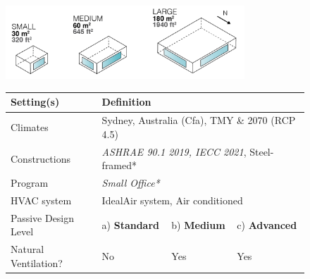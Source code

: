 
\begin{figure}[!h]
    \centering
    \includegraphics[width=0.8\textwidth]{manuscript/src/figures/scenario-size.png}
    \vspace{0.5cm}

        \renewcommand{\arraystretch}{1.25}
    

        \begin{tabular}{ p{3.5cm} p{2cm} p{2cm} p{2cm} }
        
            \hline
            
            {\textbf{Setting(s)}} & \multicolumn{3}{l}{\textbf{Definition}} \\
        
            \hline
        
            {Climates}  & \multicolumn{3}{l}{Sydney, Australia (Cfa), TMY \& 2070 (RCP 4.5)} \\
        
            
            {Constructions} & \multicolumn{3}{l}{\textit{ASHRAE 90.1 2019, IECC 2021}, Steel-framed*} \\
        
            
            {Program} & \multicolumn{3}{l}{\textit{Small Office*}} \\
            
        
            {HVAC system} & \multicolumn{3}{l}{IdealAir system, Air conditioned} \\
        

            {Passive Design Level} & {a) \textbf{Standard}} & {b) \textbf{Medium}} & {c) \textbf{Advanced}} \\

            \cline{2-4}
        
            {Natural Ventilation?} & {No} & {Yes} & {Yes} \\
        


\end{tabular}
\end{figure}
